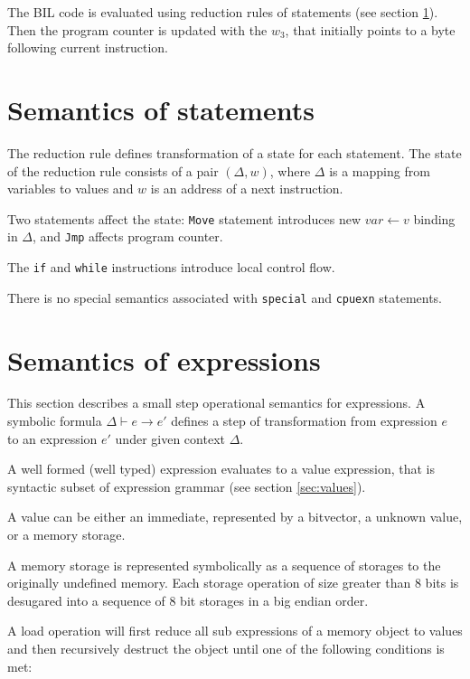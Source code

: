 \documentclass[11pt]{article}
\begin{document}
The BIL code is evaluated using reduction rules of statements (see
section \ref{sec:sema:stmt}). Then the program counter is updated with
the $w_3$, that initially points to a byte following current instruction.

\ottdefnsprogram

\section{Semantics of statements}
\label{sec:sema:stmt}

The reduction rule defines transformation of a state for each
statement. The state of the reduction rule consists of a pair
$(\Delta,w)$, where $\Delta$ is a mapping from variables to values and
$w$ is an address of a next instruction.

Two statements affect the state: \verb|Move| statement introduces new
$var \leftarrow v$ binding in $\Delta$, and \verb|Jmp| affects
program counter.

The \verb|if| and \verb|while| instructions introduce local control
flow.

There is no special semantics associated with \verb|special| and
\verb|cpuexn| statements.

\ottdefnsreduceXXstmt


\section {Semantics of expressions}
\label{sec:sema:exp}

This section describes a small step operational semantics for
expressions. A symbolic formula $\Delta \vdash e \rightarrow e' $
defines a step of transformation from expression $e$ to an expression
$e'$ under given context $\Delta$.

A well formed (well typed) expression evaluates to a value expression,
that is syntactic subset of expression grammar (see
section \ref{sec:values}).

A value can be either an immediate, represented by a bitvector, a
unknown value, or a memory storage.

A memory storage is represented symbolically as a sequence of
storages to the originally undefined memory. Each storage
operation of size greater than 8 bits is desugared into a sequence of
8 bit storages in a big endian order.

A load operation will first reduce all sub expressions of a memory
object to values and then recursively destruct the object until one of
the following conditions is met:
\end{document}
